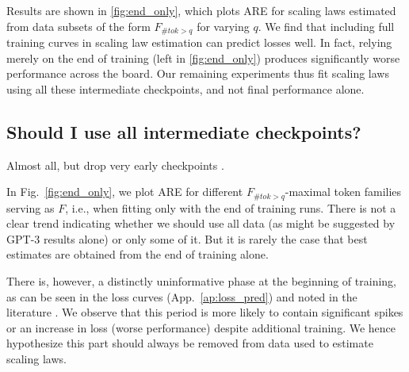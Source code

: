 \documentclass{article}
\theoremstyle{plain}
\theoremstyle{definition}
\theoremstyle{remark}
\newcommand{\mathmsize}{\#\texttt{params}}
\newcommand{\mathtokens}{\#\texttt{toks}}
\newcommand{\msize}{$\mathmsize{}$}
\newcommand{\tokens}{$\mathtokens{}$}
\DeclareMathOperator{\Send}{end}
\newcommand{\xfamily}{F}
\newcommand{\maxtok}[1]{\xfamily_{\# tok>#1}}
\newcommand{\summarybox}[1]{
  \begin{tcolorbox}[
    enhanced,
    colback=olive!8,
    colframe=olive!50,
    boxrule=0.5pt,
    left=8pt,
    right=8pt,
    top=6pt,
    bottom=6pt,
    arc=1.5mm,
    boxsep=0pt,
    fontupper=\normalfont\small\itshape,
    frame hidden,
    before skip=0pt,  %
    after skip=8pt,   %
  ]
    #1
  \end{tcolorbox}
}
\begin{document}


Results are shown in \cref{fig:end_only}, which plots ARE for scaling laws estimated from data subsets of the form $\maxtok{q}$ for varying $q$.
We find that including full training curves in scaling law estimation can predict losses well. In fact, relying merely on the end of training (left in \cref{fig:end_only}) produces significantly worse performance across the board. 
Our remaining experiments thus fit scaling laws using all these intermediate checkpoints, and not final performance alone.


\subsection{Should I use all intermediate checkpoints?}\label{sec:cut_begin}
\summarybox{Almost all, but drop very early checkpoints%
.}

In Fig.~\ref{fig:end_only}, we plot ARE for different $\maxtok{q}$-maximal token families serving as $F$, i.e., when fitting only with the end of training runs. There is not a clear trend indicating whether we should use all data (as might be suggested by GPT-3 results alone) or only some of it. But it is rarely the case that best estimates are obtained from the end of training alone.

There is, however, a distinctly uninformative phase at the beginning of training,
as can be seen in the loss curves (App.~\ref{ap:loss_pred}) and noted in the literature \citep[e.g.,][]{chensudden}. We observe that this period is more likely to contain significant spikes or an increase in loss (worse performance) despite additional training. We hence hypothesize this part should always be removed from data used to estimate scaling laws.
\end{document}
